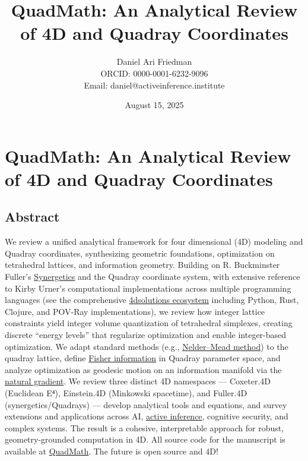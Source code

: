 \documentclass[
  10pt,
]{article}
\title{QuadMath: An Analytical Review of 4D and Quadray Coordinates}
\author{Daniel Ari Friedman\\ ORCID: 0000-0001-6232-9096\\ Email: daniel@activeinference.institute}
\date{August 15, 2025}
\begin{document}
\maketitle

{
\hypersetup{linkcolor=black}
\setcounter{tocdepth}{3}
\tableofcontents
}
\hypertarget{quadmath-an-analytical-review-of-4d-and-quadray-coordinates}{%
\section{QuadMath: An Analytical Review of 4D and Quadray
Coordinates}\label{quadmath-an-analytical-review-of-4d-and-quadray-coordinates}}

\hypertarget{abstract}{%
\subsection{Abstract}\label{abstract}}

We review a unified analytical framework for four dimensional (4D)
modeling and Quadray coordinates, synthesizing geometric foundations,
optimization on tetrahedral lattices, and information geometry. Building
on R. Buckminster Fuller's
\href{https://en.wikipedia.org/wiki/Synergetics_(Fuller)}{Synergetics}
and the Quadray coordinate system, with extensive reference to Kirby
Urner's computational implementations across multiple programming
languages (see the comprehensive
\href{https://github.com/4dsolutions}{4dsolutions ecosystem} including
Python, Rust, Clojure, and POV-Ray implementations), we review how
integer lattice constraints yield integer volume quantization of
tetrahedral simplexes, creating discrete ``energy levels'' that
regularize optimization and enable integer-based optimization. We adapt
standard methods (e.g.,
\href{https://en.wikipedia.org/wiki/Nelder\%E2\%80\%93Mead_method}{Nelder--Mead
method}) to the quadray lattice, define
\href{https://en.wikipedia.org/wiki/Fisher_information}{Fisher
information} in Quadray parameter space, and analyze optimization as
geodesic motion on an information manifold via the
\href{https://en.wikipedia.org/wiki/Natural_gradient}{natural gradient}.
We review three distinct 4D namespaces --- Coxeter.4D (Euclidean E⁴),
Einstein.4D (Minkowski spacetime), and Fuller.4D (synergetics/Quadrays)
--- develop analytical tools and equations, and survey extensions and
applications across AI,
\href{https://welcome.activeinference.institute/}{active inference},
cognitive security, and complex systems. The result is a cohesive,
interpretable approach for robust, geometry-grounded computation in 4D.
All source code for the manuscript is available at
\href{https://github.com/docxology/quadmath}{QuadMath}. The future is
open source and 4D!
\end{document}

